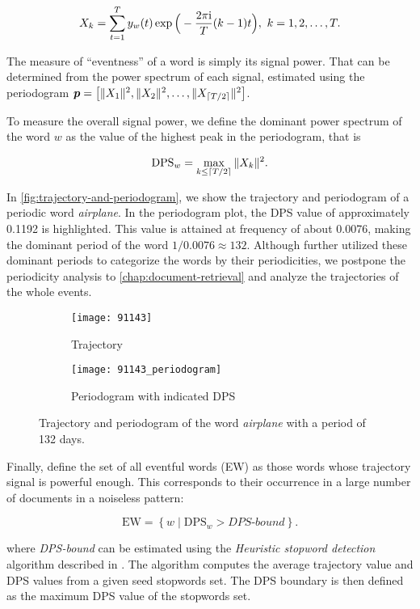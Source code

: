 \begin{equation}
	X_{k} = \sum_{t = 1}^{T}{y_{w}(t) \exp \Big(- \frac{2 \pi \mathrm{i}}{T} (k - 1) t} \Big), ~ k = 1, 2, \dots, T.
\end{equation}

The measure of ``eventness'' of a word is simply its signal power. That can be determined from the power spectrum of each signal, estimated using the periodogram $\vect{P} = \left[ \|X_{1}\|^{2}, \|X_{2}\|^{2}, \dots, \|X_{\ceil{\streamlen / 2}}\|^{2} \right]$.

To measure the overall signal power, we define the dominant power spectrum of the word $w$ as the value of the highest peak in the periodogram, that is

\begin{equation}
	\text{DPS}_{w} = \max\limits_{k \leq \lceil T / 2\rceil}{\|X_{k}\|^{2}}.
\end{equation}

In \autoref{fig:trajectory-and-periodogram}, we show the trajectory and periodogram of a periodic word \textit{airplane}. In the periodogram plot, the DPS value of approximately 0.1192 is highlighted. This value is attained at frequency of about 0.0076, making the dominant period of the word $1/0.0076 \approx 132$. Although \cite{event-detection} further utilized these dominant periods to categorize the words by their periodicities, we postpone the periodicity analysis to \autoref{chap:document-retrieval} and analyze the trajectories of the whole events.

\begin{figure}[H]
\centering
\begin{subfigure}{.5\textwidth}
  \centering
  \texttt{[image: 91143]}  %
  \caption{Trajectory}
  \label{fig:letadlo}
\end{subfigure}%
\begin{subfigure}{.5\textwidth}
  \centering
  \texttt{[image: 91143\_periodogram]}  %
  \caption{Periodogram with indicated DPS}
  \label{fig:letadlo-periodogram}
\end{subfigure}
\caption{Trajectory and periodogram of the word \textit{airplane} with a period of 132 days.}
\label{fig:trajectory-and-periodogram}
\end{figure}

Finally, \cite{event-detection} define the set of all eventful words (EW) as those words whose trajectory signal is powerful enough. This corresponds to their occurrence in a large number of documents in a noiseless pattern:

\begin{equation}
	\text{EW} = \left\{ w \mid \text{DPS}_{w} > \textit{DPS-bound} \right\}.
\end{equation}

where \textit{DPS-bound} can be estimated using the \textit{Heuristic stopword detection} algorithm described in \cite{event-detection}. The algorithm computes the average trajectory value and DPS values from a given seed stopwords set. The DPS boundary is then defined as the maximum DPS value of the stopwords set.